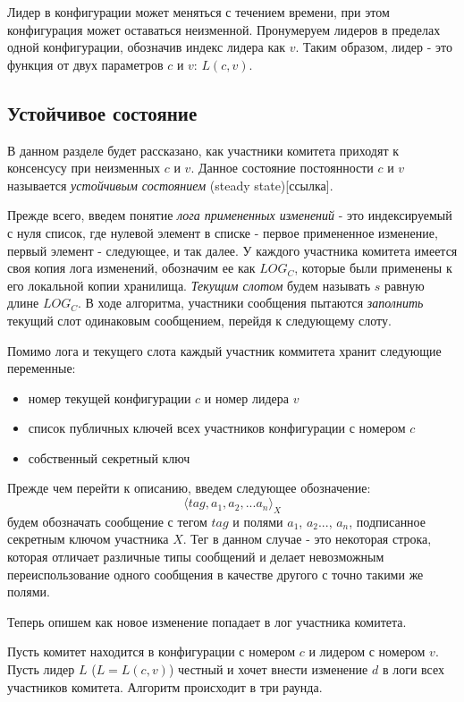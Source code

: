Лидер в конфигурации может меняться с течением времени, при этом конфигурация может оставаться неизменной. Пронумеруем лидеров в пределах одной конфигурации, обозначив индекс лидера как $v$. Таким образом, лидер - это функция от двух параметров $c$ и $v$: $L(c, v)$.

\subsection{Устойчивое состояние}
В данном разделе будет рассказано, как участники комитета приходят к консенсусу при неизменных $c$ и $v$. Данное состояние постоянности $c$ и $v$ называется \textit{устойчивым состоянием} (steady state)[ссылка].

Прежде всего, введем понятие \textit{лога примененных изменений} - это индексируемый с нуля список, где нулевой элемент в списке - первое примененное изменение, первый элемент - следующее, и так далее. У каждого участника комитета имеется своя копия лога изменений, обозначим ее как $LOG_C$, которые были применены к его локальной копии хранилища. \textit{Текущим слотом} будем называть $s$ равную длине $LOG_C$. 
В ходе алгоритма, участники сообщения пытаются \textit{заполнить} текущий слот одинаковым сообщением, перейдя к следующему слоту.

Помимо лога и текущего слота каждый участник коммитета хранит следующие переменные:
\begin{itemize}
\item номер текущей конфигурации $c$ и номер лидера $v$
\item список публичных ключей всех участников конфигурации с номером $c$
\item собственный секретный ключ
\end{itemize}

Прежде чем перейти к описанию, введем следующее обозначение:
\[ \langle tag, a_1, a_2, ... a_n \rangle_X \] будем обозначать сообщение с тегом $tag$ и полями $a_1$, $a_2$..., $a_n$, подписанное секретным ключом участника $X$. Тег в данном случае - это некоторая строка, которая отличает различные типы сообщений и делает невозможным переиспользование одного сообщения в качестве другого с точно такими же полями.

Теперь опишем как новое изменение попадает в лог участника комитета.

Пусть комитет находится в конфигурации с номером $c$ и лидером с номером $v$. 
Пусть лидер $L$ ($L = L(c, v)$) честный и хочет внести изменение $d$ в логи всех участников комитета. Алгоритм происходит в три раунда.

